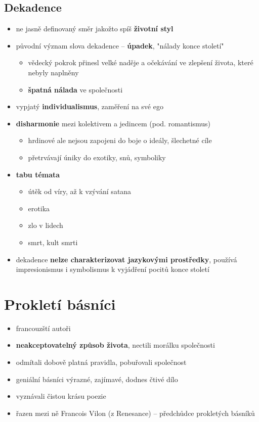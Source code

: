 \subsection{Dekadence}
\begin{itemize}
\item ne jasně definovaný směr jakožto spíš \textbf{životní styl}
\item původní význam slova dekadence -- \textbf{úpadek}, "nálady konce století" 
	\begin{itemize}
	\item vědecký pokrok přinesl velké naděje a očekávání ve zlepšení života, které nebyly naplněny
	\item[\ra] \textbf{špatná nálada} ve společnosti
	\end{itemize}
\item vypjatý \textbf{individualismus}, zaměření na své ego
\item \textbf{disharmonie} mezi kolektivem a jedincem (pod. romantismus)
	\begin{itemize}
	\item hrdinové ale nejsou zapojeni do boje o ideály, šlechetné cíle
	\item přetrvávají úniky do exotiky, snů, symboliky
	\end{itemize}
\item \textbf{tabu témata}
	\begin{itemize}
	\item útěk od víry, až k vzývání satana
	\item erotika
	\item zlo v lidech
	\item smrt, kult smrti
	\end{itemize}
\item dekadence \textbf{nelze charakterizovat jazykovými prostředky}, používá impresionismus i symbolismus k vyjádření pocitů konce století
\end{itemize}

\section{Prokletí básníci}
\begin{itemize}
\item francouzští autoři
\item \textbf{neakceptovatelný způsob života}, nectili morálku společnosti
\item odmítali dobově platná pravidla, pobuřovali společnost
\item geniální básníci \ra výrazné, zajímavé, dodnes čtivé dílo
\item vyznávali čistou krásu poezie
\item řazen mezi ně Francois Vilon (z Renesance) -- předchůdce prokletých básníků
\end{itemize}

